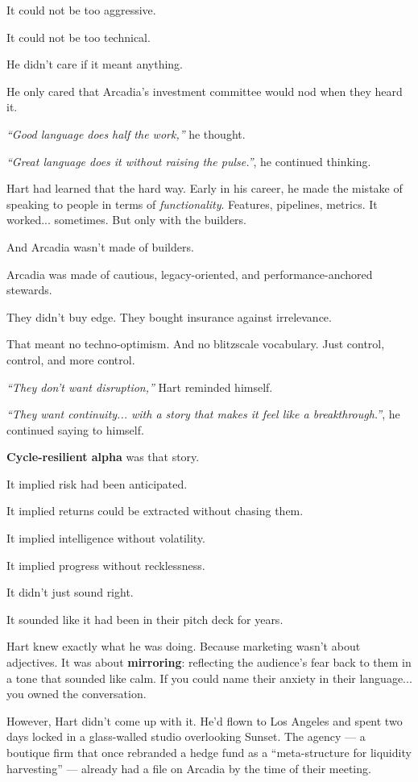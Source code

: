 It could not be too aggressive.  

It could not be too technical.  

He didn’t care if it meant anything.

He only cared that Arcadia’s investment committee would nod when they heard it.

\textit{``Good language does half the work,''} he thought.  

\textit{``Great language does it without raising the pulse.''}, he continued thinking.

Hart had learned that the hard way.  
Early in his career, he made the mistake of speaking to people in terms of \textit{functionality}.  
Features, pipelines, metrics. It worked... sometimes.  
But only with the builders.

And Arcadia wasn’t made of builders.  

Arcadia was made of cautious, legacy-oriented, and performance-anchored stewards.  

They didn’t buy edge.  They bought insurance against irrelevance.

That meant no techno-optimism. And no blitzscale vocabulary.  
Just control, control, and more control.

\textit{``They don’t want disruption,''} Hart reminded himself. 

\textit{``They want continuity... with a story that makes it feel like a breakthrough.''}, he continued saying to himself.

\textbf{Cycle-resilient alpha} was that story.

It implied risk had been anticipated.  

It implied returns could be extracted without chasing them.  

It implied intelligence without volatility. 

It implied progress without recklessness.

It didn’t just sound right. 

It sounded like it had been in their pitch deck for years.

Hart knew exactly what he was doing.  
Because marketing wasn’t about adjectives.  
It was about \textbf{mirroring}: reflecting the audience’s fear back to them in a tone that sounded like calm.  
If you could name their anxiety in their language...  
you owned the conversation.

However, Hart didn’t come up with it.
He’d flown to Los Angeles and spent two days locked in a glass-walled studio overlooking Sunset.
The agency --- a boutique firm that once rebranded a hedge fund as a “meta-structure for liquidity harvesting” --- already 
had a file on Arcadia by the time of their meeting.

